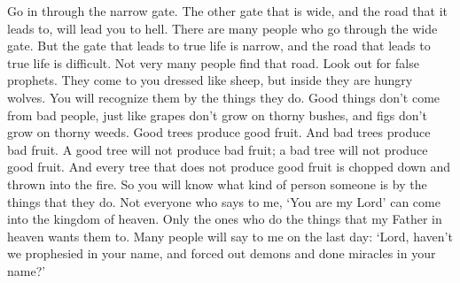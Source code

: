 \bverse \iffalse Enter ye in at the strait gate; for wide is the gate, and broad is the way, which leadeth to destruction, and many there be who go in thereat; \fi
Go in through the narrow gate. The other gate that is wide, and the road that it leads to, will lead you to hell. There are many people who go through the wide gate.
\bverse \iffalse Because strait is the gate, and narrow is the way, which leadeth unto life, and few there be that find it. \fi
But the gate that leads to true life is narrow, and the road that leads to true life is difficult. Not very many people find that road.
\bverse \iffalse Beware of false prophets, who come to you in sheep's clothing, but inwardly they are ravening wolves. \fi
Look out for false prophets. They come to you dressed like sheep, but inside they are hungry wolves.
\bverse \iffalse Ye shall know them by their fruits. Do men gather grapes of thorns, or figs of thistles? \fi
You will recognize them by the things they do. Good things don't come from bad people, just like grapes don't grow on thorny bushes, and figs don't grow on thorny weeds.
\bverse \iffalse Even so every good tree bringeth forth good fruit; but a corrupt tree bringeth forth evil fruit. \fi
Good trees produce good fruit. And bad trees produce bad fruit.
\bverse \iffalse A good tree cannot bring forth evil fruit, neither a corrupt tree bring forth good fruit. \fi
A good tree will not produce bad fruit; a bad tree will not produce good fruit.
\bverse \iffalse Every tree that bringeth not forth good fruit is hewn down, and cast into the fire. \fi
And every tree that does not produce good fruit is chopped down and thrown into the fire.
\bverse \iffalse Wherefore, by their fruits ye shall know them. \fi
So you will know what kind of person someone is by the things that they do.
\bverse \iffalse Not every one that saith unto me, Lord, Lord, shall enter into the kingdom of heaven; but he that doeth the will of my Father who is in heaven. \fi
Not everyone who says to me, \lq You are my Lord\rq{} can come into the kingdom of heaven. Only the ones who do the things that my Father in heaven wants them to.
\bverse \iffalse Many will say to me in that day: Lord, Lord, have we not prophesied in thy name, and in thy name have cast out devils, and in thy name done many wonderful works? \fi
Many people will say to me on the last day: \lq Lord, haven't we prophesied in your name, and forced out demons and done miracles in your name?\rq
